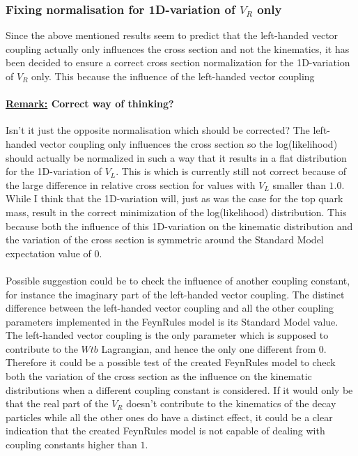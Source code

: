 \subsubsection{Fixing normalisation for 1D-variation of $V_R$ only}
Since the above mentioned results seem to predict that the left-handed vector coupling actually only influences the cross section and not the kinematics, it has been decided to ensure a correct cross section normalization for the 1D-variation of $V_R$ only. This because the influence of the left-handed vector coupling \\

\paragraph{\underline{Remark:} Correct way of thinking?\\}
Isn't it just the opposite normalisation which should be corrected? The left-handed vector coupling only influences the cross section so the log(likelihood) should actually be normalized in such a way that it results in a flat distribution for the 1D-variation of $V_L$. This is which is currently still not correct because of the large difference in relative cross section for values with $V_L$ smaller than $1.0$. While I think that the 1D-variation will, just as was the case for the top quark mass, result in the correct minimization of the log(likelihood) distribution. This because both the influence of this 1D-variation on the kinematic distribution and the variation of the cross section is symmetric around the Standard Model expectation value of $0$.\\
\\
Possible suggestion could be to check the influence of another coupling constant, for instance the imaginary part of the left-handed vector coupling. The distinct difference between the left-handed vector coupling and all the other coupling parameters implemented in the FeynRules model is its Standard Model value. The left-handed vector coupling is the only parameter which is supposed to contribute to the $Wtb$ Lagrangian, and hence the only one different from $0$. Therefore it could be a possible test of the created FeynRules model to check both the variation of the cross section as the influence on the kinematic distributions when a different coupling constant is considered. If it would only be that the real part of the $V_R$ doesn't contribute to the kinematics of the decay particles while all the other ones do have a distinct effect, it could be a clear indication that the created FeynRules model is not capable of dealing with coupling constants higher than $1$.

